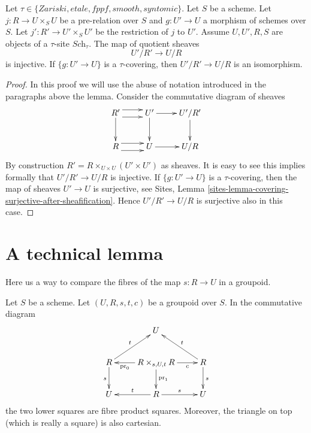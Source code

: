 \begin{lemma}
\label{lemma-quotient-groupoid-restrict}
Let $\tau \in \{Zariski, etale, fppf, smooth, syntomic\}$.
Let $S$ be a scheme.
Let $j : R \to U\times_S U$ be a pre-relation over $S$
and $g : U' \to U$ a morphism of schemes over $S$.
Let $j' : R' \to U' \times_S U'$ be the restriction of $j$ to $U'$. 
Assume  $U, U', R, S$ are objects of a $\tau$-site $\textit{Sch}_\tau$.
The map of quotient sheaves
$$
U'/R' \longrightarrow U/R
$$
is injective. If $\{g : U' \to U\}$ is a $\tau$-covering, then
$U'/R' \to U/R$ is an isomorphism.
\end{lemma}

\begin{proof}
In this proof we will use the abuse of notation introduced
in the paragraphs above the lemma. Consider the commutative
diagram of sheaves
$$
\xymatrix{
R' \ar@<1ex>[r] \ar@<-1ex>[r] \ar[d] &
U' \ar[r] \ar[d] &
U'/R' \ar[d] \\
R \ar@<1ex>[r] \ar@<-1ex>[r] &
U \ar[r] &
U/R
}
$$
By construction $R' = R \times_{U \times U} (U' \times U')$ as
sheaves. It is easy to see this implies formally that
$U'/R' \to U/R$ is injective. If $\{g : U' \to U\}$ is a $\tau$-covering, then
the map of sheaves $U' \to U$ is surjective, see
Sites, Lemma \ref{sites-lemma-covering-surjective-after-sheafification}.
Hence $U'/R' \to U/R$ is surjective also in this case.
\end{proof}














\section{A technical lemma}
\label{section-technical-lemma}

\noindent
Here us a way to compare the fibres of the map $s : R \to U$ in
a groupoid.

\begin{lemma}
\label{lemma-diagram}
Let $S$ be a scheme.
Let $(U, R, s, t, c)$ be a groupoid over $S$.
In the commutative diagram
$$
\xymatrix{
& U & \\
R \ar[d]_s \ar[ru]^t &
R \times_{s, U, t} R
\ar[l]^-{\text{pr}_0} \ar[d]^{\text{pr}_1} \ar[r]_-c &
R \ar[d]^s \ar[lu]_t \\
U & R \ar[l]_t \ar[r]^s & U
}
$$
the two lower squares are fibre product squares.
Moreover, the triangle on top (which is really a square)
is also cartesian.
\end{lemma}

